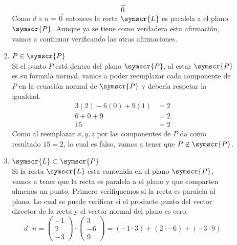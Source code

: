 \documentclass{article}
\def\fancyL{\symscr{L}}
\def\fancyP{\symscr{P}}
\begin{document}
\begin{enumerate}
\begin{itemize}
\begin{enumerate}
\[                            \vec{0}
                        \]
                        Como \(d \times n = \vec{0}\) entonces la recta \(\fancyL\) es paralela a el plano \(\fancyP\). 
                        Aunque ya se tiene como verdadera esta afirmación, vamos a continuar verificando las otras afirmaciones.
                    \item \(P \in \fancyP\) \\
                        Si el punto \(P\) está dentro del plano \(\fancyP\), al estar \(\fancyP\) es su formula normal, vamos a poder reemplazar cada 
                        componente de \(P\) en la ecuación normal de \(\fancyP\) y debería respetar la igualdad.
                        \[
                            \begin{aligned}
                                3(2) -6(0) +9(1) &= 2 \\
                                6 + 0 + 9 &= 2 \\
                                15 &= 2
                            \end{aligned}
                        \]
                        Como al reemplazar \(x,y,z\) por las componentes de \(P\) da como resultado \(15 = 2\), lo cual es falso, vamos a tener que \(P \not\in \fancyP\).
                    \item \(\fancyL \subset \fancyP\) \\
                        Si la recta \(\fancyL\) esta contenida en el plano \(\fancyP\), vamos a tener que la recta es paralela a el plano y que comparten almenos un punto.
                        Primero verifiquemos si la recta es paralela al plano. Lo cual se puede verificar si el producto punto del vector director de la recta y el vector normal 
                        del plano es cero.
                        \[
                            d \cdot n = 
                            \begin{pmatrix}
                                -1 \\ 2 \\ -3
                            \end{pmatrix}
                            \cdot 
                            \begin{pmatrix}
                                3 \\ -6 \\ 9
                            \end{pmatrix}
                            =
                            (-1 \cdot 3) + (2 \cdot -6) + (-3 \cdot 9)
\]
\end{enumerate}
\end{itemize}
\end{enumerate}
\end{document}
